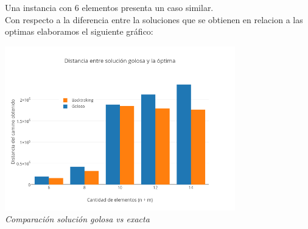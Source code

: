 \begin{figure} [!ht]
 \centering
       \label{fig:anilloexactoerror}
    \label{fig:anillogolosoerror}
    \end{figure}
    
Una instancia con 6 elementos presenta un caso similar.\\

Con respecto a la diferencia entre la soluciones que se obtienen en relacion a las optimas elaboramos el siguiente gráfico:\\
 
\vspace*{0.3cm} \vspace*{0.3cm}
  \begin{center}
 \includegraphics[width=0.75\textwidth]{./EJ2/anillosDif.png}
\\{\textit{Comparación solución golosa vs exacta}}
  \end{center}
  

